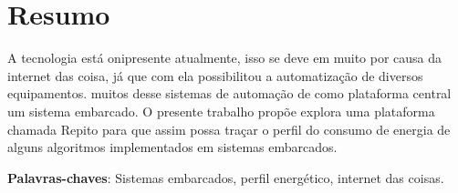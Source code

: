 \chapter*{Resumo}

\noindent A tecnologia está onipresente atualmente, isso se deve em muito por causa da internet das coisa, já que com ela possibilitou a automatização de diversos equipamentos. muitos desse sistemas de automação de como plataforma central um sistema embarcado. O presente trabalho propõe explora uma plataforma chamada Repito para que assim possa traçar o perfil do consumo de energia de alguns algoritmos implementados em sistemas embarcados.


\textbf{Palavras-chaves}: Sistemas embarcados, perfil energético, internet das coisas.
